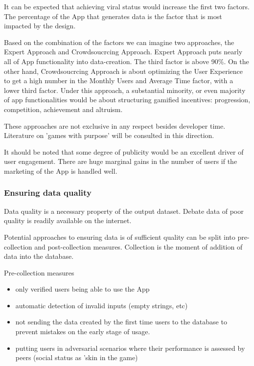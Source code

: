 \documentclass{article}
\begin{document}
It can be expected that achieving viral status would increase the first two factors. The percentage of the App that generates data is the factor that is most impacted by the design.

Based on the combination of the factors we can imagine two approaches, the Expert Approach and Crowdsoucrcing Approach. 
Expert Approach puts nearly all of App functionality into data-creation. The third factor is above {90\%}.
On the other hand, Crowdsoucrcing Approach is about optimizing the User Experience to get a high number in the Monthly Users and Average Time factor, with a lower third factor.
Under this approach, a substantial minority, or even majority of app functionalities would be about structuring gamified incentives: progression, competition, achievement and altruism.

These approaches are not exclusive in any respect besides developer time.
Literature on 'games with purpose' will be consulted in this direction.

It should be noted that some degree of publicity would be an excellent driver of user engagement. There are huge marginal gains in the number of users if the marketing of the App is handled well.

\subsubsection*{Ensuring data quality}
Data quality is a necessary property of the output dataset. Debate data of poor quality is readily available on the internet.

Potential approaches to ensuring data is of sufficient quality can be split into pre-collection and post-collection measures. Collection is the moment of addition of data into the database.

Pre-collection measures
\begin{itemize}
  \item only verified users being able to use the App
  \item automatic detection of invalid inputs (empty strings, etc)
  \item not sending the data created by the first time users to the database to prevent mistakes on the early stage of usage.
  \item putting users in adversarial scenarios where their performance is assessed by peers (social status as 'skin in the game) \cite{https://dictionary.cambridge.org/dictionary/english/have-skin-in-the-game}
\end{itemize}
\end{document}
